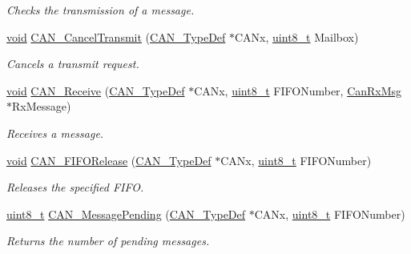 \begin{DoxyCompactItemize}
\begin{DoxyCompactList}\small\item\em Checks the transmission of a message. \end{DoxyCompactList}\item 
\hyperlink{usb__devapi_8h_afabf60e7f57651d6d595a02c75f07cd0}{void} \hyperlink{group___c_a_n___exported___functions_ga81106cdf5395a1947bfc87ec1685829e}{C\+A\+N\+\_\+\+Cancel\+Transmit} (\hyperlink{struct_c_a_n___type_def}{C\+A\+N\+\_\+\+Type\+Def} $\ast$C\+A\+Nx, \hyperlink{_p_e___types_8h_aba7bc1797add20fe3efdf37ced1182c5}{uint8\+\_\+t} Mailbox)
\begin{DoxyCompactList}\small\item\em Cancels a transmit request. \end{DoxyCompactList}\item 
\hyperlink{usb__devapi_8h_afabf60e7f57651d6d595a02c75f07cd0}{void} \hyperlink{group___c_a_n___exported___functions_ga351b90bb8a3bb0c846f85bbd56ef4dc8}{C\+A\+N\+\_\+\+Receive} (\hyperlink{struct_c_a_n___type_def}{C\+A\+N\+\_\+\+Type\+Def} $\ast$C\+A\+Nx, \hyperlink{_p_e___types_8h_aba7bc1797add20fe3efdf37ced1182c5}{uint8\+\_\+t} F\+I\+F\+O\+Number, \hyperlink{struct_can_rx_msg}{Can\+Rx\+Msg} $\ast$Rx\+Message)
\begin{DoxyCompactList}\small\item\em Receives a message. \end{DoxyCompactList}\item 
\hyperlink{usb__devapi_8h_afabf60e7f57651d6d595a02c75f07cd0}{void} \hyperlink{group___c_a_n___exported___functions_ga1bc3b39471e579b4101624c33d27918b}{C\+A\+N\+\_\+\+F\+I\+F\+O\+Release} (\hyperlink{struct_c_a_n___type_def}{C\+A\+N\+\_\+\+Type\+Def} $\ast$C\+A\+Nx, \hyperlink{_p_e___types_8h_aba7bc1797add20fe3efdf37ced1182c5}{uint8\+\_\+t} F\+I\+F\+O\+Number)
\begin{DoxyCompactList}\small\item\em Releases the specified F\+I\+FO. \end{DoxyCompactList}\item 
\hyperlink{_p_e___types_8h_aba7bc1797add20fe3efdf37ced1182c5}{uint8\+\_\+t} \hyperlink{group___c_a_n___exported___functions_ga7100459a95ce1b3cfe8ab15e112029fe}{C\+A\+N\+\_\+\+Message\+Pending} (\hyperlink{struct_c_a_n___type_def}{C\+A\+N\+\_\+\+Type\+Def} $\ast$C\+A\+Nx, \hyperlink{_p_e___types_8h_aba7bc1797add20fe3efdf37ced1182c5}{uint8\+\_\+t} F\+I\+F\+O\+Number)
\begin{DoxyCompactList}\small\item\em Returns the number of pending messages. \end{DoxyCompactList}\item 

\end{DoxyCompactItemize}
